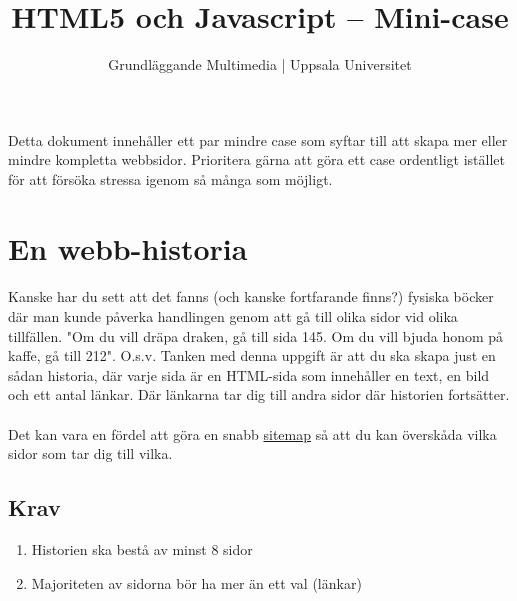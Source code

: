 \documentclass{article}
\begin{document}
  \title{ HTML5 och Javascript -- Mini-case }
  \author{ Grundläggande Multimedia | Uppsala Universitet }
  \date{}
  \maketitle

  \paragraph{}
  Detta dokument innehåller ett par mindre case som syftar till att skapa mer eller mindre kompletta webbsidor. Prioritera gärna att göra ett case ordentligt istället för att försöka stressa igenom så många som möjligt.


  \newpage
  \section{ En webb-historia }
    \paragraph{}
    Kanske har du sett att det fanns (och kanske fortfarande finns?) fysiska böcker där man kunde påverka handlingen genom att gå till olika sidor vid olika tillfällen. "Om du vill dräpa draken, gå till sida 145. Om du vill bjuda honom på kaffe, gå till 212". O.s.v. Tanken med denna uppgift är att du ska skapa just en sådan historia, där varje sida är en HTML-sida som innehåller en text, en bild och ett antal länkar. Där länkarna tar dig till andra sidor där historien fortsätter.
    \paragraph{}
    Det kan vara en fördel att göra en snabb \href{https://www.google.se/search?q=sitemap&um=1&ie=UTF-8&hl=sv&tbm=isch&source=og&sa=N&tab=wi&ei=-QVEUqT6LdD74QT69YHYCg}{sitemap} så att du kan överskåda vilka sidor som tar dig till vilka.

    \subsection*{Krav}
      \begin{enumerate}
        \item Historien ska bestå av minst 8 sidor
        \item Majoriteten av sidorna bör ha mer än ett val (länkar)
      \end{enumerate}
\end{document}

